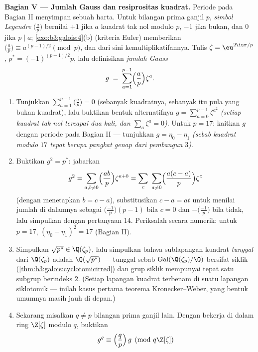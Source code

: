 \begin{problem}
\medskip
\noindent\textbf{Bagian V --- Jumlah Gauss dan resiprositas
kuadrat.} Periode pada Bagian II menyimpan sebuah harta. Untuk
bilangan prima ganjil $p$, \emph{simbol Legendre} $\bigl(\frac
ap\bigr)$ bernilai $+1$ jika $a$ kuadrat tak nol modulo $p$, $-1$ jika
bukan, dan $0$ jika $p \mid a$; \cref{exo:b3:galois:4}(b)
(kriteria Euler) memberikan $\bigl(\frac ap\bigr) \equiv
a^{(p-1)/2} \pmod p$, dan dari sini kemultiplikatifannya. Tulis $\zeta =
\eu^{2\iu\pi/p}$, $p^* = (-1)^{(p-1)/2}p$, lalu definisikan
\emph{jumlah Gauss}
\[
g \;=\; \sum_{a=1}^{p-1}\Bigl(\frac ap\Bigr)\zeta^a .
\]
\begin{enumerate}[resume]
  \item Tunjukkan $\sum_{a=1}^{p-1}\bigl(\frac ap\bigr) = 0$
        (sebanyak kuadratnya, sebanyak itu pula yang bukan kuadrat), lalu buktikan
        bentuk alternatifnya $g = \sum_{a=0}^{p-1}\zeta^{a^2}$
        \emph{(setiap kuadrat tak nol tercapai dua kali, dan
        $\sum_{a}\zeta^a = 0$)}. Untuk $p = 17$: kaitkan $g$ dengan
        periode pada Bagian II --- tunjukkan $g = \eta_0 - \eta_1$
        \emph{(sebab kuadrat modulo $17$ tepat berupa pangkat
        genap dari pembangun $3$)}.
  \item Buktikan $g^2 = p^*$: jabarkan
        \[
        g^2 = \sum_{a,b\neq0}\Bigl(\frac{ab}p\Bigr)
        \zeta^{a+b}
        = \sum_{c}\ \sum_{a \neq 0}\Bigl(\frac{a(c -
        a)}p\Bigr)\zeta^{c}
        \]
        (dengan menetapkan $b = c - a$), substitusikan $c - a = at$ untuk menilai
        jumlah di dalamnya sebagai $\bigl(\frac{-1}p\bigr)(p - 1)$ bila
        $c = 0$ dan $-\bigl(\frac{-1}p\bigr)$ bila tidak, lalu
        simpulkan dengan pertanyaan 14. Periksalah secara numerik: untuk $p =
        17$, $(\eta_0 - \eta_1)^2 = 17$ (Bagian II).
  \item Simpulkan $\sqrt{p^*} \in \Q(\zeta_p)$, lalu simpulkan
        bahwa sublapangan kuadrat \emph{tunggal} dari
        $\Q(\zeta_p)$ adalah $\Q(\sqrt{p^*})$ --- tunggal sebab
        $\operatorname{Gal}(\Q(\zeta_p)/\Q)$ bersifat siklik
        (\cref{thm:b3:galois:cyclotomicirred}) dan grup siklik
        mempunyai tepat satu subgrup berindeks $2$. (Setiap
        lapangan kuadrat terbenam di suatu lapangan siklotomik ---
        inilah kasus pertama teorema Kronecker--Weber,
        yang bentuk umumnya masih jauh di depan.)
  \item Sekarang misalkan $q \neq p$ bilangan prima ganjil lain. Dengan bekerja di
        dalam ring $\Z[\zeta]$ modulo $q$, buktikan
        \[
        g^q \equiv \Bigl(\frac qp\Bigr)\,g \pmod{q\Z[\zeta]}
\]
\end{enumerate}
\end{problem}
